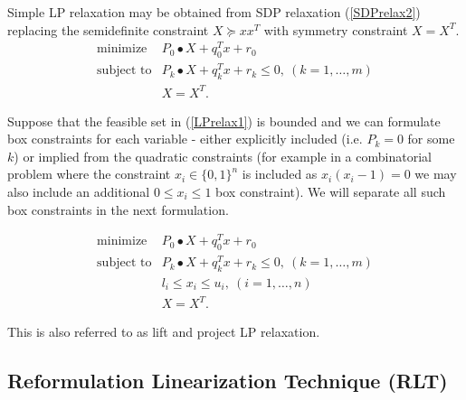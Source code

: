 \documentclass[12pt]{book}
\theoremstyle{definition}
\begin{document}
Simple LP relaxation may be obtained from SDP relaxation (\ref{SDPrelax2}) replacing the semidefinite constraint $X\succeq xx^T$ with symmetry constraint $X = X^T$.
\begin{equation}
\label{LPrelax1} 
\begin{array}{ll}
\mbox{minimize}& P_0\bullet X + q_0^Tx + r_0\\
\mbox{subject to}& P_k\bullet X+ q_k^Tx + r_k \leq 0, \  (k = 1,\dots ,m)\\
& X = X^T.
\end{array} 
\end{equation}

Suppose that the feasible set in (\ref{LPrelax1}) is bounded and we can formulate box constraints for each variable - either explicitly included (i.e.  $P_k=0$ for some $k$) or implied from the quadratic constraints (for example in a combinatorial problem where the constraint $x_i\in \{0,1\}^n$ is included as $x_i(x_i-1) = 0$ we may also include an additional $0\leq x_i \leq 1$ box constraint). We will separate all such box constraints in the next formulation. 

\begin{equation}
\label{LPrelax2} 
\begin{array}{ll}
\mbox{minimize}& P_0\bullet X + q_0^Tx + r_0\\
\mbox{subject to}& P_k\bullet X+ q_k^Tx + r_k \leq 0, \  (k = 1,\dots ,m)\\
 				& l_i\leq x_i \leq u_i, \ (i = 1,\dots ,n)\\
& X = X^T.
\end{array} 
\end{equation}

This is also referred to as lift and project LP relaxation. 

\subsection{Reformulation Linearization Technique (RLT)}
\end{document}
